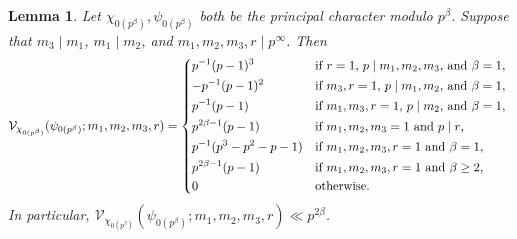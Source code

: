 \documentclass[10pt,a4paper]{amsart}
\newtheorem{lemma}{Lemma}
\newcommand{\VV}{\mathcal{V}}
\begin{document}
\begin{lemma}
\label{lem:VVchiprincprinc}
Let $\chi_{0(p^{\beta})},\psi_{0(p^{\beta})}$ both be the principal character modulo $p^{\beta}$. Suppose that $m_3 \mid m_1$, $m_1 \mid m_2$, and $m_1,m_2,m_3,r \mid p^{\infty}$. Then
\[\VV_{\chi_{0(p^{\beta})}}(\psi_{0(p^{\beta})};m_1,m_2,m_3,r) = \begin{dcases*}
p^{-1} (p - 1)^3 & if $r = 1$, $p \mid m_1,m_2,m_3$, and $\beta = 1$,	\\
-p^{-1} (p - 1)^2 & if $m_3, r = 1$, $p \mid m_1,m_2$, and $\beta = 1$,	\\
p^{-1} (p - 1) & if $m_1, m_3, r = 1$, $p \mid m_2$, and $\beta = 1$,	\\
p^{2\beta - 1} (p - 1) & if $m_1, m_2, m_3 = 1$ and $p \mid r$,	\\
p^{-1} (p^3 - p^2 - p - 1) & if $m_1, m_2, m_3, r = 1$ and $\beta = 1$,	\\
p^{2\beta - 1}(p - 1) & if $m_1, m_2, m_3, r = 1$ and $\beta \geq 2$,	\\
0 & otherwise.
\end{dcases*}\]
In particular, $\VV_{\chi_{0(p^{\beta})}}(\psi_{0(p^{\beta})};m_1,m_2,m_3,r) \ll p^{2\beta}$.
\end{lemma}
\end{document}
